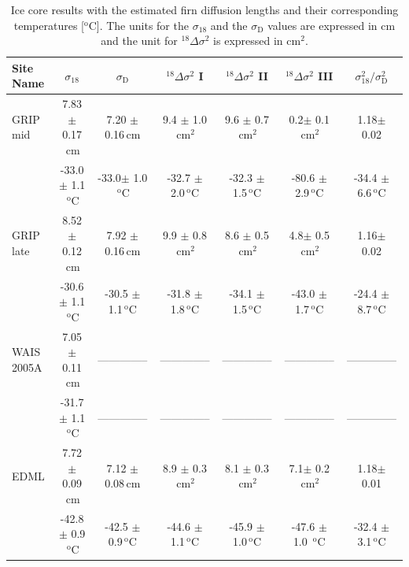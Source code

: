 \documentclass[11pt, draftcls, onecolumn]{IEEEtran} %
\numberwithin{equation}{section}
\numberwithin{table}{section}
\numberwithin{figure}{section}
\begin{document}
\begin{table}[]
	\center
	\caption{Ice core results with the estimated firn diffusion lengths and their corresponding temperatures [$^\mathrm{o}$C].
		The units for the $\sigma_{18}$ and the $\sigma_{\mathrm{D}}$ values are expressed in $\mathrm{cm}$ and the unit for ${}^{18}\Delta\sigma^2$
		is expressed in $\mathrm{cm}^2$.  }\label{tbl:icecore_results}
	\begin{tabular}{l c c c c c c} 
		\toprule
		Site Name & $\sigma_{18}$ & $\sigma_{\mathrm{D}}$ & ${}^{18}\Delta\sigma^2$  I & ${}^{18}\Delta\sigma^2$  II & ${}^{18}\Delta\sigma^2$  III & $\sigma^2_{18}/\sigma^2_{\mathrm{D}}$\\
		\midrule
		GRIP mid & 7.83 $\pm$ 0.17$\,\mathrm{cm}$& 7.20 $\pm$ 0.16$\,\mathrm{cm}$& 9.4 $\pm$ 1.0$\,\mathrm{cm}^2$& 9.6 $\pm$ 0.7$\,\mathrm{cm}^2$& 0.2$\pm$ 0.1$\,\mathrm{cm}^2$& 1.18$\pm$ 0.02\\
		& -33.0$\pm$ 1.1$\,^\mathrm{o}$C & -33.0$\pm$ 1.0$\,^\mathrm{o}$C& -32.7 $\pm$ 2.0$\,^\mathrm{o}$C& -32.3 $\pm$ 1.5$\,^\mathrm{o}$C& -80.6 $\pm$ 2.9$\,^\mathrm{o}$C& -34.4 $\pm$ 6.6$\,^\mathrm{o}$C\\
		
		GRIP late&8.52 $\pm$ 0.12$\,\mathrm{cm}$& 7.92 $\pm$ 0.16$\,\mathrm{cm}$& 9.9 $\pm$ 0.8$\,\mathrm{cm}^2$& 8.6 $\pm$ 0.5$\,\mathrm{cm}^2$& 4.8$\pm$ 0.5$\,\mathrm{cm}^2$& 1.16$\pm$ 0.02\\
		& -30.6 $\pm$ 1.1$\,^\mathrm{o}$C & -30.5 $\pm$ 1.1$\,^\mathrm{o}$C& -31.8 $\pm$ 1.8$\,^\mathrm{o}$C& -34.1 $\pm$ 1.5$\,^\mathrm{o}$C& -43.0 $\pm$ 1.7$\,^\mathrm{o}$C& -24.4 $\pm$ 8.7$\,^\mathrm{o}$C\\
		
		WAIS 2005A &7.05 $\pm$ 0.11$\,\mathrm{cm}$&--------------& --------------& --------------&--------------&--------------\\
		& -31.7 $\pm$ 1.1$\,^\mathrm{o}$C &-------------- &--------------&-------------- & --------------& --------------\\
		
		EDML &7.72 $\pm$ 0.09$\,\mathrm{cm}$& 7.12 $\pm$ 0.08$\,\mathrm{cm}$& 8.9 $\pm$ 0.3$\,\mathrm{cm}^2$& 8.1 $\pm$ 0.3$\,\mathrm{cm}^2$& 7.1$\pm$ 0.2$\,\mathrm{cm}^2$& 1.18$\pm$ 0.01\\
		& -42.8 $\pm$ 0.9$\,^\mathrm{o}$C & -42.5 $\pm$ 0.9$\,^\mathrm{o}$C& -44.6 $\pm$ 1.1$\,^\mathrm{o}$C& -45.9 $\pm$ 1.0$\,^\mathrm{o}$C& -47.6 $\pm$ 1.0 $\,^\mathrm{o}$C& -32.4 $\pm$ 3.1$\,^\mathrm{o}$C\\
		

\end{tabular}
\end{table}
\end{document}
